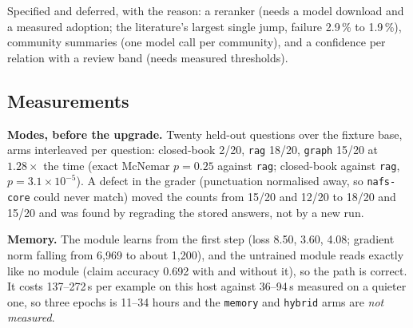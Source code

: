 Specified and deferred, with the reason: a reranker (needs a model download and a measured adoption; the literature's largest single jump, failure 2.9\,\% to
1.9\,\%), community summaries (one model call per community), and a confidence per relation with a review band (needs measured thresholds).

\subsection{Measurements}

\textbf{Modes, before the upgrade.} Twenty held-out questions over the fixture base, arms interleaved per question: closed-book 2/20, \texttt{rag} 18/20,
\texttt{graph} 15/20 at $1.28\times$ the time (exact McNemar $p=0.25$ against \texttt{rag}; closed-book against \texttt{rag}, $p=3.1{\times}10^{-5}$).
A defect in the grader (punctuation normalised away, so \texttt{nafs-core} could never match) moved the counts from 15/20 and 12/20 to 18/20 and 15/20 and
was found by regrading the stored answers, not by a new run.

\textbf{Memory.} The module learns from the first step (loss 8.50, 3.60, 4.08; gradient norm falling from 6,969 to about 1,200), and the untrained module reads
exactly like no module (claim accuracy 0.692 with and without it), so the path is correct. It costs 137--272\,s per example on this host against 36--94\,s
measured on a quieter one, so three epochs is 11--34 hours and the \texttt{memory} and \texttt{hybrid} arms are \emph{not measured}.

